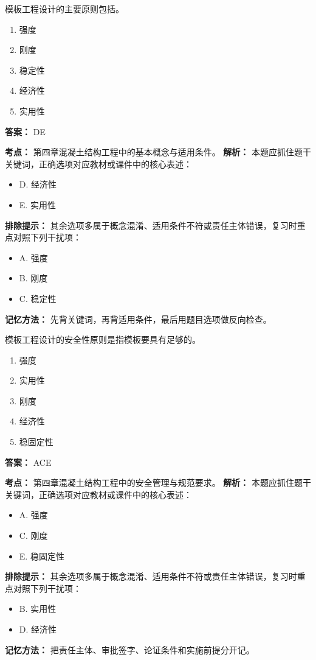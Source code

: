 \documentclass[UTF8,fontset=fandol,11pt]{ctexart}
\begin{document}
\begin{quizbox}[title={第 22 题}]
模板工程设计的主要原则包括。\\
\begin{enumerate}[label=\Alph*.]
\item 强度
\item 刚度
\item 稳定性
\item 经济性
\item 实用性
\end{enumerate}
\textbf{答案：} DE
\vspace{0.25em}
\begin{answerbox}[title={考点解析}]
\textbf{考点：} 第四章混凝土结构工程中的基本概念与适用条件。
\textbf{解析：} 本题应抓住题干关键词，正确选项对应教材或课件中的核心表述：
\begin{itemize}
\item D. 经济性
\item E. 实用性
\end{itemize}
\textbf{排除提示：} 其余选项多属于概念混淆、适用条件不符或责任主体错误，复习时重点对照下列干扰项：
\begin{itemize}
\item A. 强度
\item B. 刚度
\item C. 稳定性
\end{itemize}
\textbf{记忆方法：} 先背关键词，再背适用条件，最后用题目选项做反向检查。
\end{answerbox}
\end{quizbox}

\begin{quizbox}[title={第 23 题}]
模板工程设计的安全性原则是指模板要具有足够的。\\
\begin{enumerate}[label=\Alph*.]
\item 强度
\item 实用性
\item 刚度
\item 经济性
\item 稳固定性
\end{enumerate}
\textbf{答案：} ACE
\vspace{0.25em}
\begin{answerbox}[title={考点解析}]
\textbf{考点：} 第四章混凝土结构工程中的安全管理与规范要求。
\textbf{解析：} 本题应抓住题干关键词，正确选项对应教材或课件中的核心表述：
\begin{itemize}
\item A. 强度
\item C. 刚度
\item E. 稳固定性
\end{itemize}
\textbf{排除提示：} 其余选项多属于概念混淆、适用条件不符或责任主体错误，复习时重点对照下列干扰项：
\begin{itemize}
\item B. 实用性
\item D. 经济性
\end{itemize}
\textbf{记忆方法：} 把责任主体、审批签字、论证条件和实施前提分开记。
\end{answerbox}
\end{quizbox}
\end{document}
